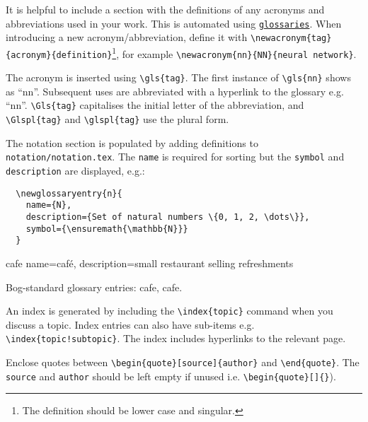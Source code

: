 

It is helpful to include a section with the definitions of any acronyms and abbreviations
used in your work. This is automated using \href{https://ctan.org/pkg/glossaries}{\texttt{glossaries}}.
When introducing a new acronym/abbreviation, define it with \verb|\newacronym{tag}{acronym}{definition}|\footnote{The 
definition should be lower case and singular.}, for example \verb|\newacronym{nn}{NN}{neural network}|.

The acronym is inserted using \verb|\gls{tag}|. The first instance of \verb|\gls{nn}| shows
as ``\gls{nn}''. Subsequent uses are abbreviated with a hyperlink to the glossary e.g. ``\gls{nn}''.
\verb|\Gls{tag}| capitalises the initial letter of the abbreviation, and \verb|\Glspl{tag}|
and \verb|\glspl{tag}| use the plural form.

The notation section is populated by adding definitions to \texttt{notation/notation.tex}. The \texttt{name} is required for sorting but the \texttt{symbol} and \texttt{description} are displayed, e.g.:
\begin{verbatim}
  \newglossaryentry{n}{
    name={N},
    description={Set of natural numbers \{0, 1, 2, \dots\}},
    symbol={\ensuremath{\mathbb{N}}}
  }
\end{verbatim}

\newglossaryentry %
 {cafe}%
 {%
   name={caf\'e},
   description={small restaurant selling refreshments}
 }

Bog-standard glossary entries: \gls{cafe}, \gls{cafe}.


An index is generated by including the \verb|\index{topic}| command when you discuss a topic.
Index entries can also have sub-items e.g. \verb|\index{topic!subtopic}|. The index includes
hyperlinks to the relevant page.


Enclose quotes between \verb|\begin{quote}[source]{author}| and \verb|\end{quote}|. The
\texttt{source} and \texttt{author} should be left empty if unused i.e. \verb|\begin{quote}[]{}|).

